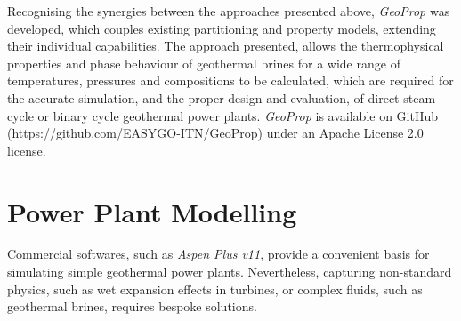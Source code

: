 
    


    Recognising the synergies between the approaches presented above, \emph{GeoProp} was developed, which couples existing partitioning and property models, extending their individual capabilities. The approach presented, allows the thermophysical properties and phase behaviour of geothermal brines for a wide range of temperatures, pressures and compositions to be calculated, which are required for the accurate simulation, and the proper design and evaluation, of direct steam cycle or binary cycle geothermal power plants. \emph{GeoProp} is available on GitHub (https://github.com/EASYGO-ITN/GeoProp) under an Apache License 2.0 license.

\section{Power Plant Modelling}
    Commercial softwares, such as \emph{Aspen Plus v11}, provide a convenient basis for simulating simple geothermal power plants. Nevertheless, capturing non-standard physics, such as wet expansion effects in turbines, or complex fluids, such as geothermal brines, requires bespoke solutions. 
    
